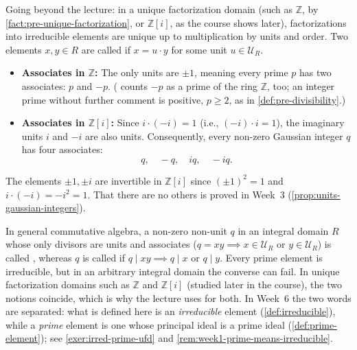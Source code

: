 \begin{content}
\begin{steps}
Going beyond the lecture: in a unique factorization domain (such as $\mathbb{Z}$, by \cref{fact:pre-unique-factorization}, or $\mathbb{Z}[i]$, as the course shows later), factorizations into irreducible elements are unique up to multiplication by units and order. Two elements $x, y \in R$ are called  if $x = u \cdot y$ for some unit $u \in \mathcal{U}_R$.
\begin{itemize}
    \item \textbf{Associates in $\mathbb{Z}$:} The only units are $\pm 1$, meaning every prime $p$ has two associates: $p$ and $-p$. ( counts $-p$ as a prime of the ring $\mathbb{Z}$, too; an integer prime without further comment is positive, $p \ge 2$, as in \cref{def:pre-divisibility}.)
    \item \textbf{Associates in {$\mathbb{Z}[i]$}:} Since $i \cdot (-i) = 1$ (i.e., $(-i) \cdot i = 1$), the imaginary units $i$ and $-i$ are also units. Consequently, every non-zero Gaussian integer $q$ has four associates:
    \[
    q, \quad -q, \quad iq, \quad -iq.
    \]
\end{itemize}
\end{steps}

\begin{steps}
The elements $\pm 1, \pm i$ are invertible in $\mathbb{Z}[i]$ since $(\pm 1)^2 = 1$ and $i \cdot (-i) = -i^2 = 1$. That there are no others is proved in Week~3 (\cref{prop:units-gaussian-integers}).
\end{steps}
\end{content}

\begin{aiNote}
In general commutative algebra, a non-zero non-unit $q$ in an integral domain $R$ whose only divisors are units and associates ($q = xy \implies x \in \mathcal{U}_R$ or $y \in \mathcal{U}_R$) is called , whereas $q$ is called  if $q \mid xy \implies q \mid x$ or $q \mid y$. Every prime element is irreducible, but in an arbitrary integral domain the converse can fail. In unique factorization domains such as $\mathbb{Z}$ and $\mathbb{Z}[i]$ (studied later in the course), the two notions coincide, which is why the lecture uses  for both. In Week~6 the two words are separated: what is defined here is an \emph{irreducible} element (\cref{def:irreducible}), while a \emph{prime} element is one whose principal ideal is a prime ideal (\cref{def:prime-element}); see \cref{exer:irred-prime-ufd} and \cref{rem:week1-prime-means-irreducible}.
\end{aiNote}

